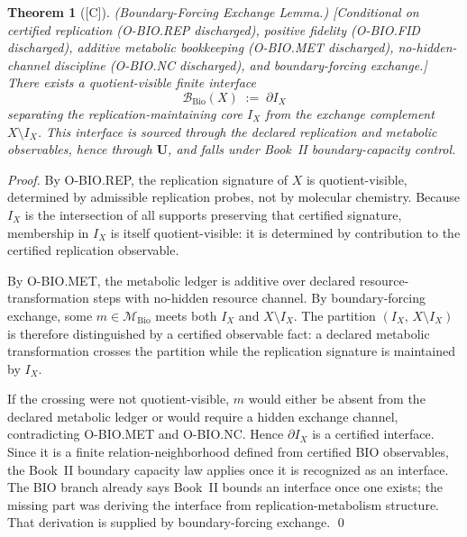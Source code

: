 \documentclass[12pt,oneside]{amsbook}
\theoremstyle{plain}
\newtheorem{theorem}{Theorem}[section]
\theoremstyle{definition}
\theoremstyle{remark}
\newcommand{\status}[1]{\textup{[#1]}}
\begin{document}
\begin{theorem}[\status{C}]\label{thm:bio-BND-boundary-forcing}
\textup{(Boundary-Forcing Exchange Lemma.)}
\textup{[Conditional on certified replication (O-BIO.REP discharged),
positive fidelity (O-BIO.FID discharged), additive metabolic
bookkeeping (O-BIO.MET discharged), no-hidden-channel discipline
(O-BIO.NC discharged), and boundary-forcing exchange.]}
There exists a quotient-visible finite interface
\[
 \mathcal{B}_{\mathrm{Bio}}(X) \;:=\; \partial I_X
\]
separating the replication-maintaining core $I_X$ from the exchange
complement $X \setminus I_X$. This interface is sourced through the
declared replication and metabolic observables, hence through
$\mathbf{U}$, and falls under Book~II boundary-capacity control.
\end{theorem}

\begin{proof}
By O-BIO.REP, the replication signature of $X$ is quotient-visible,
determined by admissible replication probes, not by molecular
chemistry. Because $I_X$ is the intersection of all supports
preserving that certified signature, membership in $I_X$ is itself
quotient-visible: it is determined by contribution to the certified
replication observable.

By O-BIO.MET, the metabolic ledger is additive over declared
resource-transformation steps with no-hidden resource channel.
By boundary-forcing exchange, some $m \in \mathcal{M}_{\mathrm{Bio}}$
meets both $I_X$ and $X \setminus I_X$. The partition
$(I_X,\, X \setminus I_X)$ is therefore distinguished by a certified
observable fact: a declared metabolic transformation crosses the
partition while the replication signature is maintained by $I_X$.

If the crossing were not quotient-visible, $m$ would either be absent
from the declared metabolic ledger or would require a hidden exchange
channel, contradicting O-BIO.MET and O-BIO.NC. Hence
$\partial I_X$ is a certified interface. Since it is a finite
relation-neighborhood defined from certified BIO observables, the
Book~II boundary capacity law applies once it is recognized as an
interface. The BIO branch already says Book~II bounds an interface
once one exists; the missing part was deriving the interface from
replication-metabolism structure. That derivation is supplied by
boundary-forcing exchange.
\qed
\end{proof}
\end{document}
